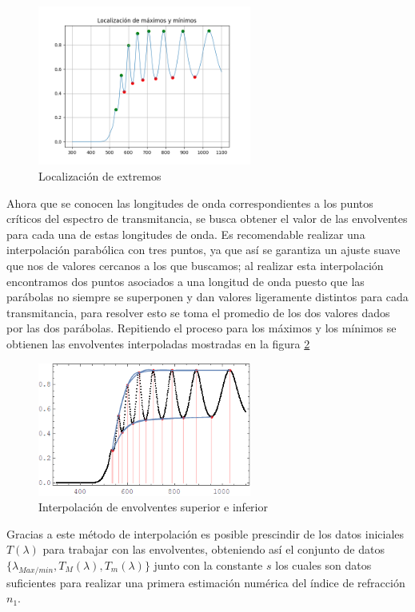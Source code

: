 \documentclass[article]{article}
\begin{document}
\begin{multicols}{2}
        \begin{figure}[H]
            \centering \includegraphics[width=7cm]{minimo_maximo.png}
            \caption{Localización de extremos}
            \label{Fig: Picos de transmitancia}
        \end{figure}
        
        Ahora que se conocen las longitudes de onda correspondientes a los puntos críticos del espectro de transmitancia, se busca obtener el valor de las envolventes para cada una de estas longitudes de onda. Es recomendable realizar una interpolación parabólica con tres puntos, ya que así se garantiza un ajuste suave que nos de valores cercanos a los que buscamos; al realizar esta interpolación encontramos dos puntos asociados a una longitud de onda puesto que las parábolas no siempre se superponen y dan valores ligeramente distintos para cada transmitancia, para resolver esto se toma el promedio de los dos valores dados por las dos parábolas. Repitiendo el proceso para los máximos y los mínimos se obtienen las envolventes interpoladas mostradas en la figura \ref{Fig: Envolventes Interpoladas}
        
        \begin{figure}[H]
            \centering \includegraphics[width=7cm]{Envolventes Interp.png}
            \caption{Interpolación de envolventes superior e inferior}
            \label{Fig: Envolventes Interpoladas}
        \end{figure}
        
        Gracias a este método de interpolación es posible prescindir de los datos iniciales $T(\lambda)$ para trabajar con las envolventes, obteniendo así el conjunto de datos $\{ \lambda_{Max/min}, T_{M}(\lambda), T_{m}(\lambda)\}$ junto con la constante $s$ los cuales son datos suficientes para realizar una primera estimación numérica del índice de refracción $n_1$. 
        

\end{multicols}
\end{document}
